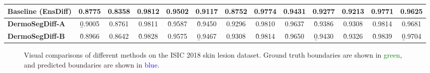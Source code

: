 \documentclass[runningheads]{llncs}
\begin{document}
\begin{table*}[!t]
{\begin{tabular}{l||cccc||cccc||cccc}
    \\
Baseline (EnsDiff) \cite{wolleb2022diffusion} &   0.8775 &   0.8358 &0.9812&   0.9502 &   0.9117 &   0.8752 &   0.9774 &   0.9431 &   0.9277 &   0.9213 &   0.9771 &   0.9625 
    \\
    \midrule
    \rowcolor[HTML]{C8FFFD}
    \bf{DermoSegDiff-A}                 &   \b{0.9005} &   0.8761 &   0.9811 &   \r{0.9587} &\r{0.9450}&   0.9296 &   0.9810 &   0.9637 &\r{0.9386}&   0.9308 & 0.9814 & 0.9681 
    \\
    \rowcolor[HTML]{C8FFFD}
    \bf{DermoSegDiff-B}                 &\r{0.8966} &   0.8642 &   \r{0.9828} &   0.9575   &\b{0.9467}&   0.9308 &\r{0.9814}&\r{0.9650}&\b{0.9430}&\r{0.9326}&\r{0.9839}&\b{0.9704}
    \\
\bottomrule
    \end{tabular}
    }
\end{table*}





\begin{figure}[!t]
    \centering
    \caption{Visual comparisons of different methods on the ISIC 2018 skin lesion dataset. Ground truth boundaries are shown
    in \textcolor{green}{green}, and predicted boundaries are shown in \textcolor{blue}{blue}.} 
    
    \label{fig:visualcomparison_isic}
\end{figure}
\end{document}
